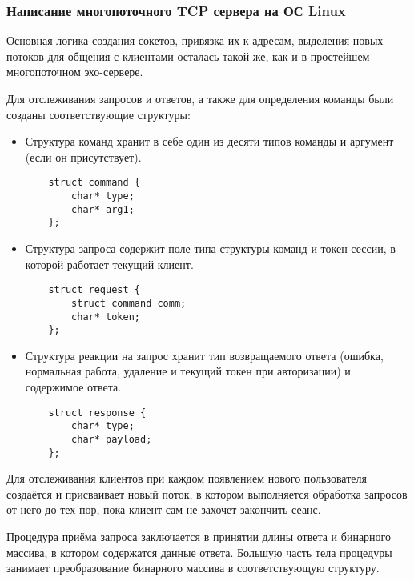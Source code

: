 \subsubsection{Написание многопоточного TCP сервера на ОС Linux}
Основная логика создания сокетов, привязка их к адресам, выделения новых потоков для общения с клиентами осталась такой же, как и в простейшем многопоточном эхо-сервере.

Для отслеживания запросов и ответов, а также для определения команды были созданы соответствующие структуры: 

\begin{itemize}
	\item Структура команд хранит в себе один из десяти типов команды и аргумент (если он присутствует).
	
	\begin{lstlisting}
	struct command {
		char* type;
		char* arg1;
	};
	\end{lstlisting}
	
	\item Структура запроса содержит поле типа структуры команд и токен сессии, в которой работает текущий клиент.
	
	\begin{lstlisting}
	struct request {
		struct command comm;
		char* token;
	};
	\end{lstlisting}
	
	\item Структура реакции на запрос хранит тип возвращаемого ответа (ошибка, нормальная работа, удаление и текущий токен при авторизации) и содержимое ответа.
	
	\begin{lstlisting}
	struct response {
		char* type;
		char* payload;
	};
	\end{lstlisting}
\end{itemize}

Для отслеживания клиентов при каждом появлением нового пользователя создаётся и присваивает новый поток, в котором выполняется обработка запросов от него до тех пор, пока клиент сам не захочет закончить сеанс.

Процедура приёма запроса заключается в принятии длины ответа и бинарного массива, в котором содержатся данные ответа. Большую часть тела процедуры занимает преобразование бинарного массива в соответствующую структуру.

